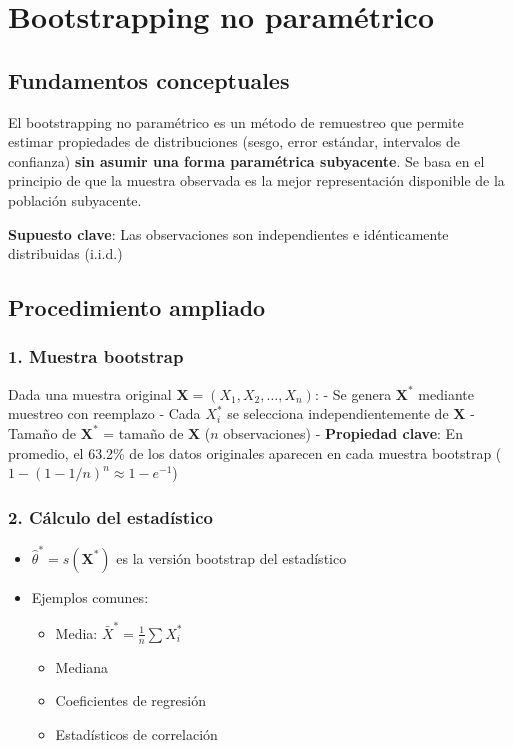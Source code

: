 \documentclass[
  spanish,
  11pt,
]{article}
\providecommand{\tightlist}{%
  \setlength{\itemsep}{0pt}\setlength{\parskip}{0pt}}
\begin{document}
\section{Bootstrapping no
paramétrico}\label{bootstrapping-no-paramuxe9trico}

\subsection{Fundamentos conceptuales}\label{fundamentos-conceptuales}

El bootstrapping no paramétrico es un método de remuestreo que permite
estimar propiedades de distribuciones (sesgo, error estándar, intervalos
de confianza) \textbf{sin asumir una forma paramétrica subyacente}. Se
basa en el principio de que la muestra observada es la mejor
representación disponible de la población subyacente.

\textbf{Supuesto clave}: Las observaciones son independientes e
idénticamente distribuidas (i.i.d.)

\subsection{Procedimiento ampliado}\label{procedimiento-ampliado}

\subsubsection{1. Muestra bootstrap}\label{muestra-bootstrap}

Dada una muestra original \(\mathbf{X} = (X_1, X_2, \dots, X_n)\): - Se
genera \(\mathbf{X}^{*}\) mediante muestreo con reemplazo - Cada
\(X_i^{*}\) se selecciona independientemente de \(\mathbf{X}\) - Tamaño
de \(\mathbf{X}^{*}\) = tamaño de \(\mathbf{X}\) (\(n\) observaciones) -
\textbf{Propiedad clave}: En promedio, el 63.2\% de los datos originales
aparecen en cada muestra bootstrap
(\(1 - (1 - 1/n)^n \approx 1-e^{-1}\))

\subsubsection{2. Cálculo del
estadístico}\label{cuxe1lculo-del-estaduxedstico}

\begin{itemize}
\tightlist
\item
  \(\hat{\theta}^{*} = s(\mathbf{X}^{*})\) es la versión bootstrap del
  estadístico
\item
  Ejemplos comunes:

  \begin{itemize}
  \tightlist
  \item
    Media: \(\bar{X}^{*} = \frac{1}{n}\sum X_i^{*}\)
  \item
    Mediana
  \item
    Coeficientes de regresión
  \item
    Estadísticos de correlación
  \end{itemize}
\end{itemize}
\end{document}
